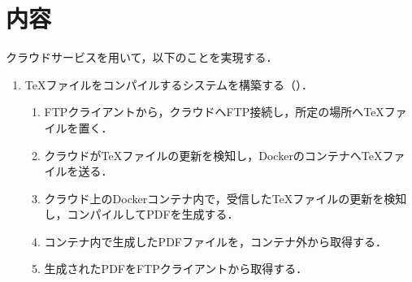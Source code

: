 \section{内容}
クラウドサービスを用いて，以下のことを実現する．
\begin{enumerate}
    \renewcommand{\labelenumi}{\theenumi.\ }
    \renewcommand{\labelenumi}{\theenumi.\ }
    \item \TeX ファイルをコンパイルするシステムを構築する（）．
          \begin{enumerate}
              \renewcommand{\labelenumii}{\theenumii. }
              \item FTPクライアントから，クラウドへFTP接続し，所定の場所へ\TeX ファイルを置く．
              \item クラウドが\TeX ファイルの更新を検知し，Dockerのコンテナへ\TeX ファイルを送る．
              \item クラウド上のDockerコンテナ内で，受信した\TeX ファイルの更新を検知し，コンパイルしてPDFを生成する．
              \item コンテナ内で生成したPDFファイルを，コンテナ外から取得する．
              \item 生成されたPDFをFTPクライアントから取得する．
          \end{enumerate}
\end{enumerate}
